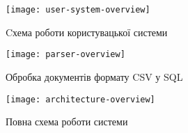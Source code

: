 \chapter{}

\begin{figure}[h]
\centering
\texttt{[image: user-system-overview]}
\caption{Cхема роботи користувацької системи}
\label{fig:user-system-overview}
\end{figure}

\begin{figure}[h]
\centering
\texttt{[image: parser-overview]}
\caption{Обробка документів формату CSV у SQL}
\label{fig:parser-overview}
\end{figure}

\begin{figure}[h]
\centering
\texttt{[image: architecture-overview]}
\caption{Повна схема роботи системи}
\label{fig:architecture-overview}
\end{figure}
